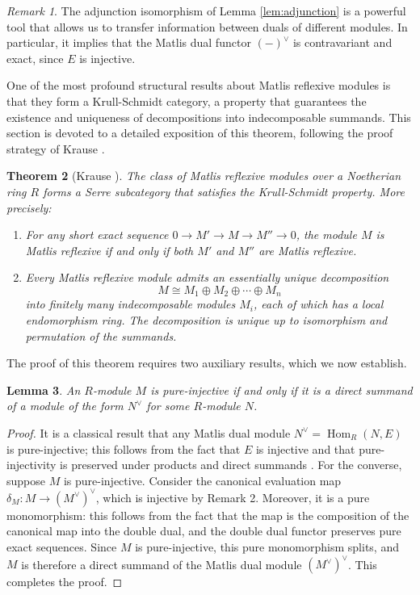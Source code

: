\documentclass{kms-c}
\theoremstyle{plain}
\newtheorem{theorem}{Theorem}[section]
\newtheorem{lemma}[theorem]{Lemma}
\theoremstyle{definition}
\theoremstyle{remark}
\newtheorem{remark}[theorem]{Remark}
\begin{document}
\begin{remark}
The adjunction isomorphism of Lemma \ref{lem:adjunction} is a powerful tool that allows us to transfer information between duals of different modules. In particular, it implies that the Matlis dual functor \( (-)^\vee \) is contravariant and exact, since \( E \) is injective.
\end{remark}

One of the most profound structural results about Matlis reflexive modules is that they form a Krull-Schmidt category, a property that guarantees the existence and uniqueness of decompositions into indecomposable summands. This section is devoted to a detailed exposition of this theorem, following the proof strategy of Krause \cite{Krause2025}.

\begin{theorem}[Krause \cite{Krause2025}]
\label{thm:krull-schmidt}
The class of Matlis reflexive modules over a Noetherian ring \( R \) forms a Serre subcategory that satisfies the Krull-Schmidt property. More precisely:
\begin{enumerate}
\item For any short exact sequence \( 0 \to M' \to M \to M'' \to 0 \), the module \( M \) is Matlis reflexive if and only if both \( M' \) and \( M'' \) are Matlis reflexive.
\item Every Matlis reflexive module admits an essentially unique decomposition
\[
M \cong M_1 \oplus M_2 \oplus \cdots \oplus M_n
\]
into finitely many indecomposable modules \( M_i \), each of which has a local endomorphism ring. The decomposition is unique up to isomorphism and permutation of the summands.
\end{enumerate}
\end{theorem}

The proof of this theorem requires two auxiliary results, which we now establish.

\begin{lemma}
\label{lem:pure-injective}
An \( R \)-module \( M \) is pure-injective if and only if it is a direct summand of a module of the form \( N^\vee \) for some \( R \)-module \( N \).
\end{lemma}
\begin{proof}
It is a classical result that any Matlis dual module \( N^\vee = \operatorname{Hom}_R(N, E) \) is pure-injective; this follows from the fact that \( E \) is injective and that pure-injectivity is preserved under products and direct summands \cite[Proposition I.10.1]{Auslander1978}. For the converse, suppose \( M \) is pure-injective. Consider the canonical evaluation map \( \delta_M : M \to (M^\vee)^\vee \), which is injective by Remark 2. Moreover, it is a pure monomorphism: this follows from the fact that the map is the composition of the canonical map into the double dual, and the double dual functor preserves pure exact sequences. Since \( M \) is pure-injective, this pure monomorphism splits, and \( M \) is therefore a direct summand of the Matlis dual module \( (M^\vee)^\vee \). This completes the proof. 
\end{proof}
\end{document}
